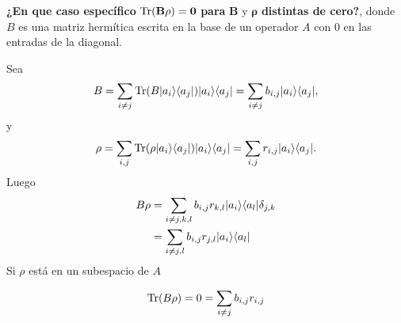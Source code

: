 \documentclass[12pt,oneside]{book}\raggedbottom{}
\begin{document}
\begin{comment}
\begin{equation}
	\begin{split}
		=&\sum_{i,l \in R}a_i b_l \tr\{P_{a_i,b_l}\rho\}+\frac{(1+q)}{2}\sum_{(j,k)\in S}a_j b_k  \tr\{P_{a_j,b_k}\rho P_{a_j,b_k}\}\\
		+&\frac{(1-q)}{2}\sum_{(j,k)\in S}a_j b_k \tr\{P_{a_j,b_k}\rho SP_{a_j,b_k}S\}\\+ &\frac{(1-q)}{2}\sum_{(j,k)\in S}a_j b_k  \tr\{SP_{a_j,b_k}S\rho P_{a_j,b_k}\}\\
		+ &\frac{(1-q)}{2}\sum_{(j,k)\in S}a_j b_k  \tr\{SP_{a_j,b_k}S\rho SP_{a_j,b_k}S\}
	\end{split}
\end{equation}


\end{comment}
\pagebreak



\textbf{¿En que caso específico} $\mathbf{{\rm Tr}(B\rho)=0}$ \textbf{para} $\mathbf{B}$ y $\mathbf{\rho}$ \textbf{distintas de cero?}, donde $B$ es una matriz hermítica escrita en la base de un operador $A$ con $0$ en las entradas de la diagonal.  

Sea \[B=\sum_{i\ne j}{\rm Tr}(B|a_i\rangle \langle a_j|)|a_i\rangle \langle a_j|=\sum_{i\ne j}b_{i,j}|a_i\rangle \langle a_j|,\] y \[\rho =\sum_{i, j}{\rm Tr}(\rho|a_i\rangle \langle a_j|)|a_i\rangle \langle a_j|=\sum_{i,j}r_{i,j}|a_i\rangle \langle a_j|.\] Luego \[\begin{split}B\rho&=\sum_{i\ne j,k,l}b_{i,j}r_{k,l}|a_i\rangle \langle a_l|\delta_{j,k}\\
	&=\sum_{i\ne j,l}b_{i,j}r_{j,l}|a_i\rangle \langle a_l|\\
\end{split}\]
Si $\rho$ está en un subespacio de $A$

\[{\rm Tr}(B\rho)=0=\sum_{i\ne j}b_{i,j}r_{i,j}\]
\end{document}
